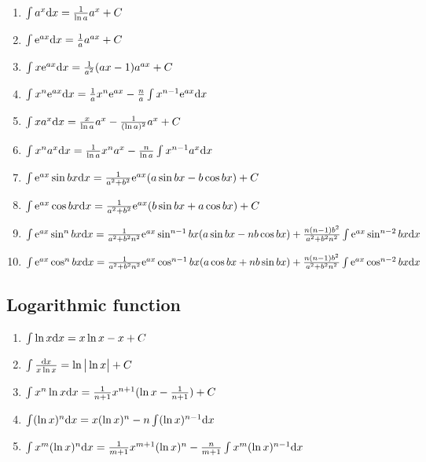 	\begin{enumerate}

	\item $ \int a^x \mathrm{d} x= \frac{1}{\ln a} a^x + C$

	\item $ \int \mathrm{e} ^{ax}\mathrm{d} x=\frac{1}{a}a^{ax}+C $

	\item $ \int x \mathrm{e}  ^ {ax} \mathrm{d} x=\frac{1}{a^2}(ax-1)a^{ax} +C $

	\item $ \int x^n \mathrm{e} ^{ax} \mathrm{d} x=\frac{1}{a}x^n \mathrm{e} ^{ax}-\frac{n}{a} \int x^{n-1} \mathrm{e} ^ {ax} \mathrm{d} x $

	\item $ \int x a^x \mathrm{d} x = \frac{x}{\ln a}a^x-\frac{1}{(\ln a)^2}a^x+C $

	\item $ \int x^n a^x \mathrm{d} x= \frac{1}{\ln a}x^n a^x-\frac{n}{\ln a}\int x^{n-1}a^x \mathrm{d} x $

	\item $ \int \mathrm{e} ^{ax} \sin bx \mathrm{d} x = \frac{1}{a^2+b^2}\mathrm{e} ^{ax}(a \sin bx - b \cos bx)+C $

	\item $ \int \mathrm{e} ^{ax} \cos bx \mathrm{d} x = \frac{1}{a^2+b^2}\mathrm{e} ^{ax}(b \sin bx + a \cos bx)+C $

	\item $ \int \mathrm{e} ^{ax} \sin ^ n bx \mathrm{d} x=\frac{1}{a^2+b^2 n^2}\mathrm{e} ^{ax} \sin ^ {n-1} bx (a \sin bx -nb \cos bx) +\frac{n(n-1)b^2}{a^2+b^2 n^2}\int \mathrm{e} ^{ax} \sin ^{n-2} bx \mathrm{d} x $

	\item $ \int \mathrm{e} ^{ax} \cos ^ n bx \mathrm{d} x=\frac{1}{a^2+b^2 n^2}\mathrm{e} ^{ax} \cos ^ {n-1} bx (a \cos bx +nb \sin bx) +\frac{n(n-1)b^2}{a^2+b^2 n^2}\int \mathrm{e} ^{ax} \cos ^{n-2} bx \mathrm{d} x $

	\end{enumerate}

	\subsection{Logarithmic function}

	\begin{enumerate}

	\item $ \int \ln x \mathrm{d} x = x \ln x - x + C$

	\item $ \int \frac{\mathrm{d} x}{x \ln x} =\ln \big | \ln x \big |+C $

	\item $ \int x^n \ln x \mathrm{d} x = \frac{1}{n+1}x^{n+1}(\ln x - \frac{1}{n+1} ) +C $

	\item $ \int (\ln x)^{n} \mathrm{d} x = x(\ln x)^ n - n \int (\ln x)^{n-1} \mathrm{d} x $

	\item $ \int x ^ m(\ln x)^n \mathrm{d} x=\frac{1}{m+1}x^{m+1} (\ln x)^n - \frac{n}{m+1} \int x^m(\ln x)^{n-1}\mathrm{d} x $

	\end{enumerate}

